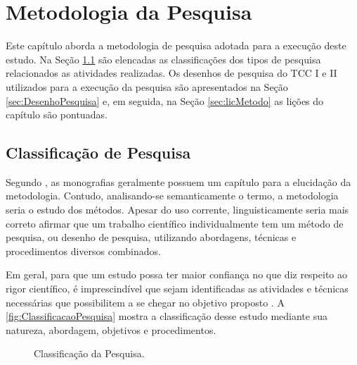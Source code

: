\chapter{Metodologia da Pesquisa}\label{metodologiaPesquisa}

Este capítulo aborda a metodologia de pesquisa adotada para a execução deste estudo. 
Na Seção \ref{sec:TiposPesquisa} são elencadas as classificações dos tipos de pesquisa relacionados as atividades realizadas. 
Os desenhos de pesquisa do \ac{TCC} I e II utilizados para a execução da pesquisa são apresentados na Seção \ref{sec:DesenhoPesquisa} e, em seguida, na Seção \ref{sec:licMetodo} as lições do capítulo são pontuadas.

\section{Classificação de Pesquisa} \label{sec:TiposPesquisa}

Segundo , as monografias geralmente possuem um capítulo para a elucidação da metodologia. 
Contudo, analisando-se semanticamente o termo, a metodologia seria o estudo dos métodos. 
Apesar do uso corrente, linguisticamente seria mais correto afirmar que um trabalho científico individualmente tem um método de pesquisa, ou desenho de pesquisa, utilizando abordagens, técnicas e procedimentos diversos combinados.

Em geral, para que um estudo possa ter maior confiança no que diz respeito ao rigor científico, é imprescindível que sejam identificadas as atividades e técnicas necessárias que possibilitem a se chegar no objetivo proposto \cite{Peffers:2007}. A \autoref{fig:ClassificacaoPesquisa} mostra a classificação desse estudo mediante sua natureza, abordagem, objetivos e procedimentos. 



\begin{figure}[!htb]
\centering
\caption{Classificação da Pesquisa.}

\label{fig:ClassificacaoPesquisa}
\end{figure}

